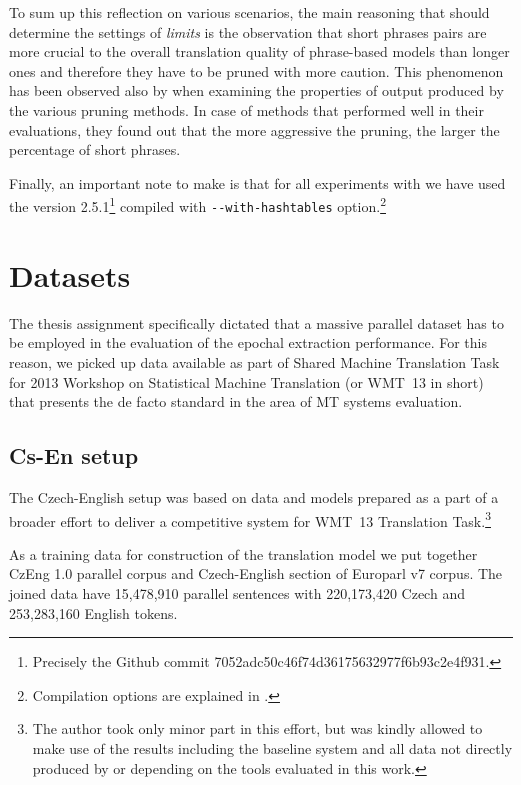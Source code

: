 To sum up this reflection on various \eppex{} scenarios, the main reasoning that should
determine the settings of \emph{limits} is the observation that short phrases pairs are
more crucial to the overall translation quality of phrase-based models than longer ones
and therefore they have to be pruned with more caution.
This phenomenon has been observed also by \citet[p. 7]{zens:systcomp} when examining the
properties of output produced by the various pruning methods. In case of methods that
performed well in their evaluations, they found out that the more aggressive the pruning,
the larger the percentage of short phrases.

Finally, an important note to make is that for all experiments with \eppex{} we have used
the version 2.5.1\footnote{Precisely the Github commit 7052adc50c46f74d36175632977f6b93c2e4f931.}
compiled with \verb|--with-hashtables| option.\footnote{Compilation options are explained in
.}

\section{Datasets}

The thesis assignment specifically dictated that a massive parallel dataset has to be
employed in the evaluation of the epochal extraction performance.
For this reason, we picked up data available as part of Shared Machine Translation Task
for 2013 Workshop on Statistical Machine Translation (or WMT~13 in short) that presents
the de facto standard in the area of MT systems evaluation.

\subsection{Cs-En setup}

The Czech-English setup was based on data and models prepared as a part of a broader
effort to deliver a competitive system for WMT~13 Translation Task.\footnote{The author
took only minor part in this effort, but was kindly allowed to make use of the results
including the baseline system and all data not directly produced by or depending on
the tools evaluated in this work.}

As a training data for construction of the translation model we put together CzEng 1.0
parallel corpus \citep{czeng10:lrec2012}
and Czech-English section of Europarl v7 corpus.
The joined data have 15,478,910 parallel sentences with 220,173,420 Czech and 253,283,160
English tokens.

